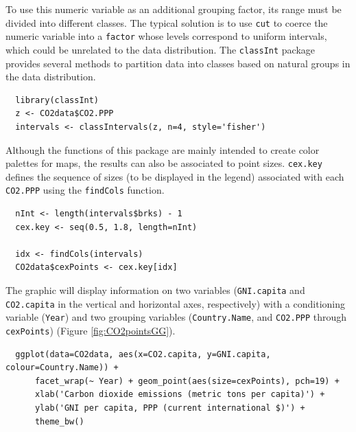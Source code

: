 To use this numeric variable as an additional grouping factor, its range must be divided into different classes. The typical solution is to use \texttt{cut} to coerce the numeric variable into a \texttt{factor} whose levels correspond to uniform intervals, which could be unrelated to the data distribution. The \texttt{classInt} package \cite{Bivand2013} provides several methods to partition data into classes based on natural groups in the data distribution.


\lstset{language=r,label= ,caption= ,captionpos=b,numbers=none}
\begin{lstlisting}
  library(classInt)
  z <- CO2data$CO2.PPP
  intervals <- classIntervals(z, n=4, style='fisher')
\end{lstlisting}

Although the functions of this package are mainly intended to create color palettes for maps, the results can also be associated to point sizes. \texttt{cex.key} defines the sequence of sizes (to be displayed in the legend) associated with each \texttt{CO2.PPP} using the \texttt{findCols} function.
\lstset{language=r,label= ,caption= ,captionpos=b,numbers=none}
\begin{lstlisting}
  nInt <- length(intervals$brks) - 1
  cex.key <- seq(0.5, 1.8, length=nInt)
  
  idx <- findCols(intervals)
  CO2data$cexPoints <- cex.key[idx]
\end{lstlisting}

The graphic will display information on two variables (\texttt{GNI.capita} and \texttt{CO2.capita} in the vertical and horizontal axes, respectively) with a conditioning variable (\texttt{Year}) and two grouping variables (\texttt{Country.Name}, and \texttt{CO2.PPP} through \texttt{cexPoints}) (Figure \ref{fig:CO2pointsGG}).

\lstset{language=r,label= ,caption= ,captionpos=b,numbers=none}
\begin{lstlisting}
  ggplot(data=CO2data, aes(x=CO2.capita, y=GNI.capita, colour=Country.Name)) +
      facet_wrap(~ Year) + geom_point(aes(size=cexPoints), pch=19) +
      xlab('Carbon dioxide emissions (metric tons per capita)') +
      ylab('GNI per capita, PPP (current international $)') +
      theme_bw()
\end{lstlisting}

